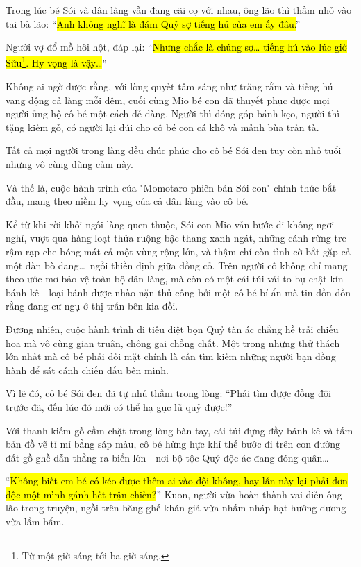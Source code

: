 \documentclass[../main.tex]{subfiles}
\begin{document}
Trong lúc bé Sói và dân làng vẫn đang cãi cọ với nhau, ông lão thì thầm nhỏ vào tai bà lão: ``\hl{Anh không nghĩ là đám Quỷ sợ tiếng hú của em ấy đâu.}''

Người vợ đổ mồ hôi hột, đáp lại: ``\hl{Nhưng chắc là chúng sợ\dots{} tiếng hú vào lúc giờ Sửu\footnote{Từ một giờ sáng tới ba giờ sáng.}. Hy vọng là vậy\dots}''

Không ai ngờ được rằng, với lòng quyết tâm sáng như trăng rằm và tiếng hú vang động cả làng mỗi đêm, cuối cùng Mio bé con đã thuyết phục được mọi người ủng hộ cô bé một cách dễ dàng. Người thì đóng góp bánh kẹo, người thì tặng kiếm gỗ, có người lại dúi cho cô bé con cá khô và mảnh bùa trấn tà.

Tất cả mọi người trong làng đều chúc phúc cho cô bé Sói đen tuy còn nhỏ tuổi nhưng vô cùng dũng cảm này.

Và thế là, cuộc hành trình của "Momotaro phiên bản Sói con" chính thức bắt đầu, mang theo niềm hy vọng của cả dân làng vào cô bé.

\ct

Kể từ khi rời khỏi ngôi làng quen thuộc, Sói con Mio vẫn bước đi không ngơi nghỉ, vượt qua hàng loạt thửa ruộng bậc thang xanh ngát, những cánh rừng tre rậm rạp che bóng mát cả một vùng rộng lớn, và thậm chí còn tình cờ bắt gặp cả một đàn bò đang\dots\ ngồi thiền định giữa đồng cỏ. Trên người cô không chỉ mang theo ước mơ bảo vệ toàn bộ dân làng, mà còn có một cái túi vải to bự chật kín bánh kê - loại bánh được nhào nặn thủ công bởi một cô bé bí ẩn mà tin đồn đồn rằng đang cư ngụ ở thị trấn bên kia đồi.

Đương nhiên, cuộc hành trình đi tiêu diệt bọn Quỷ tàn ác chẳng hề trải chiếu hoa mà vô cùng gian truân, chông gai chồng chất. Một trong những thử thách lớn nhất mà cô bé phải đối mặt chính là cần tìm kiếm những người bạn đồng hành để sát cánh chiến đấu bên mình.

Vì lẽ đó, cô bé Sói đen đã tự nhủ thầm trong lòng: ``Phải tìm được đồng đội trước đã, đến lúc đó mới có thể hạ gục lũ quỷ được!''

Với thanh kiếm gỗ cầm chặt trong lòng bàn tay, cái túi đựng đầy bánh kê và tấm bản đồ vẽ tỉ mỉ bằng sáp màu, cô bé hừng hực khí thế bước đi trên con đường đất gồ ghề dẫn thẳng ra biển lớn - nơi bộ tộc Quỷ độc ác đang đóng quân\dots

``\hl{Không biết em bé có kéo được thêm ai vào đội không, hay lần này lại phải đơn độc một mình gánh hết trận chiến?}'' Kuon, người vừa hoàn thành vai diễn ông lão trong truyện, ngồi trên băng ghế khán giả vừa nhấm nháp hạt hướng dương vừa lẩm bẩm.
\end{document}
